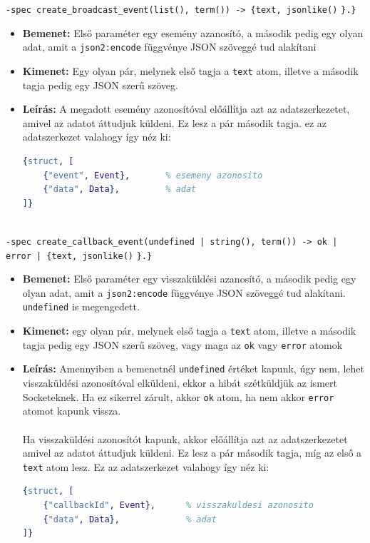 \noindent \lstinline{-spec create_broadcast_event(list(), term()) -> {text, jsonlike()} \lstinline|}.}|
\begin{itemize}
    \item \textbf{Bemenet:} Első paraméter egy esemény azanosító, a második pedig egy olyan adat, amit a \lstinline{json2:encode} függvénye JSON szöveggé tud alakítani
    \item \textbf{Kimenet:} Egy olyan pár, melynek első tagja a \lstinline{text} atom, illetve a második tagja pedig egy JSON szerű szöveg. 
    \item \textbf{Leírás:} A megadott esemény azonosítóval előállítja azt az adatszerkezetet, amivel az adatot áttudjuk küldeni. Ez lesz a pár második tagja. ez az adatszerkezet valahogy így néz ki:
\lstset{caption=Esemény alapú küldés szerkezete, label=src:erlang} \label{structQueryRes2}
\begin{lstlisting}[language={erlang}]
{struct, [
    {"event", Event},       % esemeny azonosito
    {"data", Data},         % adat
]}
\end{lstlisting}
\end{itemize} \\

\noindent \lstinline{-spec create_callback_event(undefined | string(), term()) -> ok | error | {text, jsonlike()} \lstinline|}.}|
\begin{itemize}
    \item \textbf{Bemenet:} Első paraméter egy visszaküldési azanosító, a második pedig egy olyan adat, amit a \lstinline{json2:encode} függvénye JSON szöveggé tud alakítani. \lstinline{undefined} is megengedett.
    \item \textbf{Kimenet:} egy olyan pár, melynek első tagja a \lstinline{text} atom, illetve a második tagja pedig egy JSON szerű szöveg, vagy maga az \lstinline{ok} vagy \lstinline{error} atomok
    \item \textbf{Leírás:} Amennyiben a bemenetnél \lstinline{undefined} értéket kapunk, úgy nem, lehet visszaküldési azonosítóval elküldeni, ekkor a hibát szétküldjük az ismert Socketeknek. Ha ez sikerrel zárult, akkor \lstinline{ok} atom, ha nem akkor \lstinline{error} atomot kapunk vissza. \\ \\ Ha visszaküldési azonosítót kapunk, akkor előállítja azt az adatszerkezetet amivel az adatot áttudjuk küldeni. Ez lesz a pár második tagja, míg az első a \lstinline{text} atom lesz. Ez az adatszerkezet valahogy így néz ki:

\lstset{caption=Visszaküldési azonosítós küldés szerkezete, label=src:erlang} \label{structQueryRes3}
\begin{lstlisting}[language={erlang}]
{struct, [
    {"callbackId", Event},      % visszakuldesi azonosito
    {"data", Data},             % adat
]}
\end{lstlisting}
\end{itemize} \\

